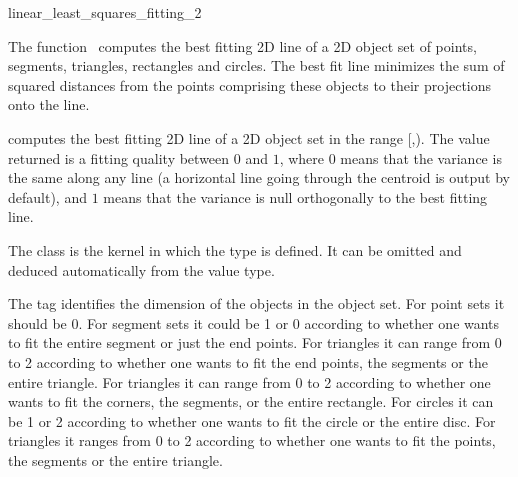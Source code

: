 
\begin{ccRefFunction}{linear_least_squares_fitting_2}  

\ccDefinition
  
The function \ccRefName\ computes the best fitting 2D line of a 2D object set of points, segments, triangles, rectangles and circles. The best fit line minimizes the sum of squared distances from the points comprising these objects to their projections onto the line.


{ computes the best fitting 2D line of a 2D object set in the range
[,). The value returned is a fitting quality
between $0$ and $1$, where $0$ means that the variance is the same
along any line (a horizontal line going through the centroid is output
by default), and $1$ means that the variance is null orthogonally
to the best fitting line.
 }


The class  is the kernel in which the type  is defined. It can be omitted and
deduced automatically from the value type.

The tag  identifies the dimension of the objects in the object set. For point sets it should be 0. For segment sets it could be 1 or 0 according to whether one wants to fit the entire segment or just the end points. For triangles it can range from 0 to 2 according to whether one wants to fit the end points, the segments or the entire triangle. For triangles it can range from 0 to 2 according to whether one wants to fit the corners, the segments, or the entire rectangle. For circles it can be 1 or 2 according to whether one wants to fit the circle or the entire disc. For triangles it ranges from 0 to 2 according to whether one wants to fit the points, the segments or the entire triangle.



\end{ccRefFunction}
